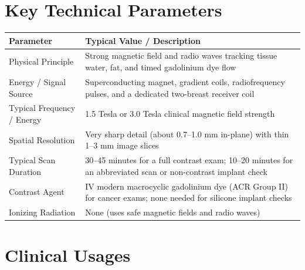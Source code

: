 \section{Key Technical Parameters}
\noindent
\begin{tabularx}{\textwidth}{@{}l X@{}}
\toprule
\textbf{Parameter} & \textbf{Typical Value / Description} \\
\midrule
Physical Principle & Strong magnetic field and radio waves tracking tissue water, fat, and timed gadolinium dye flow \\
Energy / Signal Source & Superconducting magnet, gradient coils, radiofrequency pulses, and a dedicated two-breast receiver coil \\
Typical Frequency / Energy & 1.5 Tesla or 3.0 Tesla clinical magnetic field strength \\
Spatial Resolution & Very sharp detail (about 0.7--1.0 mm in-plane) with thin 1--3 mm image slices \\
Typical Scan Duration & 30--45 minutes for a full contrast exam; 10--20 minutes for an abbreviated scan or non-contrast implant check \\
Contrast Agent & IV modern macrocyclic gadolinium dye (ACR Group II) for cancer exams; none needed for silicone implant checks \\
Ionizing Radiation & None (uses safe magnetic fields and radio waves) \\
\bottomrule
\end{tabularx}

\section{Clinical Usages}

